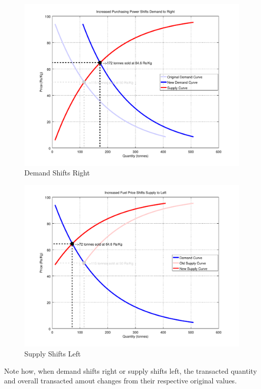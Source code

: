	\begin{figure}[h]
		\centering
		\includegraphics[width = \textwidth]{supplyDemand/rightShiftDemand}
		\caption{Demand Shifts Right}
		\label{fig:demandRightCurve}
	\end{figure}
	
	\begin{figure}[h]
		\centering
		\includegraphics[width = \textwidth]{supplyDemand/leftShiftSupply}
		\caption{Supply Shifts Left}
		\label{fig:supplyLeftCurve}
	\end{figure}
	
	Note how, when demand shifts right or supply shifts left, the transacted quantity and overall transacted amout changes from their respective original values. 
	
